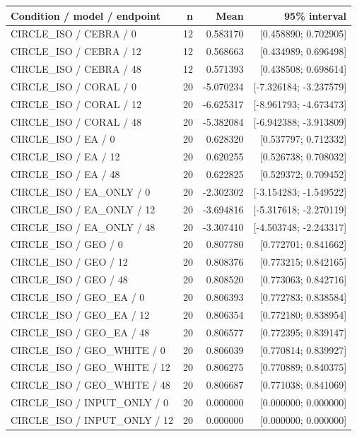 \begin{longtable}{p{.56\linewidth}rrr}
\toprule Condition / model / endpoint & n & Mean & 95\% interval\\\midrule
CIRCLE\_ISO / CEBRA / 0 & 12 & 0.583170 & [0.458890; 0.702905] \\
CIRCLE\_ISO / CEBRA / 12 & 12 & 0.568663 & [0.434989; 0.696498] \\
CIRCLE\_ISO / CEBRA / 48 & 12 & 0.571393 & [0.438508; 0.698614] \\
CIRCLE\_ISO / CORAL / 0 & 20 & -5.070234 & [-7.326184; -3.237579] \\
CIRCLE\_ISO / CORAL / 12 & 20 & -6.625317 & [-8.961793; -4.673473] \\
CIRCLE\_ISO / CORAL / 48 & 20 & -5.382084 & [-6.942388; -3.913809] \\
CIRCLE\_ISO / EA / 0 & 20 & 0.628320 & [0.537797; 0.712332] \\
CIRCLE\_ISO / EA / 12 & 20 & 0.620255 & [0.526738; 0.708032] \\
CIRCLE\_ISO / EA / 48 & 20 & 0.622825 & [0.529372; 0.709452] \\
CIRCLE\_ISO / EA\_ONLY / 0 & 20 & -2.302302 & [-3.154283; -1.549522] \\
CIRCLE\_ISO / EA\_ONLY / 12 & 20 & -3.694816 & [-5.317618; -2.270119] \\
CIRCLE\_ISO / EA\_ONLY / 48 & 20 & -3.307410 & [-4.503748; -2.243317] \\
CIRCLE\_ISO / GEO / 0 & 20 & 0.807780 & [0.772701; 0.841662] \\
CIRCLE\_ISO / GEO / 12 & 20 & 0.808376 & [0.773215; 0.842165] \\
CIRCLE\_ISO / GEO / 48 & 20 & 0.808520 & [0.773063; 0.842716] \\
CIRCLE\_ISO / GEO\_EA / 0 & 20 & 0.806393 & [0.772783; 0.838584] \\
CIRCLE\_ISO / GEO\_EA / 12 & 20 & 0.806354 & [0.772180; 0.838954] \\
CIRCLE\_ISO / GEO\_EA / 48 & 20 & 0.806577 & [0.772395; 0.839147] \\
CIRCLE\_ISO / GEO\_WHITE / 0 & 20 & 0.806039 & [0.770814; 0.839927] \\
CIRCLE\_ISO / GEO\_WHITE / 12 & 20 & 0.806275 & [0.770889; 0.840375] \\
CIRCLE\_ISO / GEO\_WHITE / 48 & 20 & 0.806687 & [0.771038; 0.841069] \\
CIRCLE\_ISO / INPUT\_ONLY / 0 & 20 & 0.000000 & [0.000000; 0.000000] \\
CIRCLE\_ISO / INPUT\_ONLY / 12 & 20 & 0.000000 & [0.000000; 0.000000] \\

\end{longtable}
